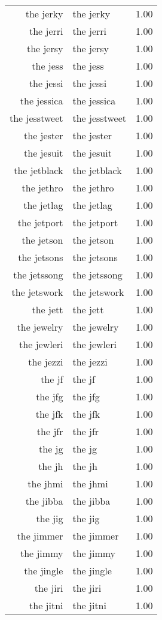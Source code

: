 \begin{table}[ht]
\begin{tabular}{rlr}
  the jerky & the jerky & 1.00 \\ 
  the jerri & the jerri & 1.00 \\ 
  the jersy & the jersy & 1.00 \\ 
  the jess & the jess & 1.00 \\ 
  the jessi & the jessi & 1.00 \\ 
  the jessica & the jessica & 1.00 \\ 
  the jesstweet & the jesstweet & 1.00 \\ 
  the jester & the jester & 1.00 \\ 
  the jesuit & the jesuit & 1.00 \\ 
  the jetblack & the jetblack & 1.00 \\ 
  the jethro & the jethro & 1.00 \\ 
  the jetlag & the jetlag & 1.00 \\ 
  the jetport & the jetport & 1.00 \\ 
  the jetson & the jetson & 1.00 \\ 
  the jetsons & the jetsons & 1.00 \\ 
  the jetssong & the jetssong & 1.00 \\ 
  the jetswork & the jetswork & 1.00 \\ 
  the jett & the jett & 1.00 \\ 
  the jewelry & the jewelry & 1.00 \\ 
  the jewleri & the jewleri & 1.00 \\ 
  the jezzi & the jezzi & 1.00 \\ 
  the jf & the jf & 1.00 \\ 
  the jfg & the jfg & 1.00 \\ 
  the jfk & the jfk & 1.00 \\ 
  the jfr & the jfr & 1.00 \\ 
  the jg & the jg & 1.00 \\ 
  the jh & the jh & 1.00 \\ 
  the jhmi & the jhmi & 1.00 \\ 
  the jibba & the jibba & 1.00 \\ 
  the jig & the jig & 1.00 \\ 
  the jimmer & the jimmer & 1.00 \\ 
  the jimmy & the jimmy & 1.00 \\ 
  the jingle & the jingle & 1.00 \\ 
  the jiri & the jiri & 1.00 \\ 
  the jitni & the jitni & 1.00 \\ 

\end{tabular}
\end{table}
